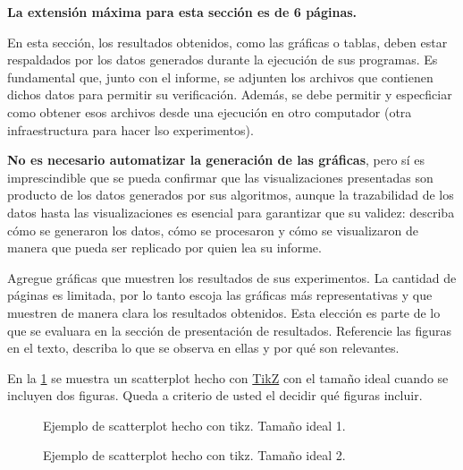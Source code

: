 \begin{mdframed}
    \textbf{La extensión máxima para esta sección es de 6 páginas.}
\end{mdframed}


En esta sección, los resultados obtenidos, como las gráficas o tablas, deben estar respaldados por los datos generados durante la ejecución de sus programas. Es fundamental que, junto con el informe, se adjunten los archivos que contienen dichos datos para permitir su verificación. Además, se debe permitir y especficiar como obtener esos archivos desde una ejecución en otro computador (otra infraestructura para hacer lso experimentos).

\textbf{No es necesario automatizar la generación de las gráficas}, pero sí es imprescindible que se pueda confirmar que las visualizaciones presentadas son producto de los datos generados por sus algoritmos, aunque la trazabilidad de los datos hasta las visualizaciones es esencial para garantizar que su validez: describa cómo se generaron los datos, cómo se procesaron y cómo se visualizaron de manera que pueda ser replicado por quien lea su informe.

Agregue gráficas que muestren los resultados de sus experimentos. La cantidad de páginas es limitada, por lo tanto escoja las gráficas más representativas y que muestren de manera clara los resultados obtenidos. Esta elección es parte de lo que se evaluara en la sección de presentación de resultados. Referencie las figuras en el texto, describa lo que se observa en ellas y por qué son relevantes.

En la \cref{fig:scatterplot_1} se muestra un scatterplot hecho con \href{https://es.overleaf.com/learn/latex/TikZ_package}{TikZ} con el tamaño ideal cuando se incluyen dos figuras. Queda a criterio de usted el decidir qué figuras incluir.

\begin{figure}[H]
    \centering
    
    \caption{Ejemplo de scatterplot hecho con tikz. Tamaño ideal 1.}
    \label{fig:scatterplot_1}
\end{figure}


\begin{figure}[H]
    \centering
    \begin{minipage}[t]{0.5\textwidth}
    
    \end{minipage}%
    \begin{minipage}[t]{0.5\textwidth}
    
    \end{minipage}%
    \caption{Ejemplo de scatterplot hecho con tikz. Tamaño ideal 2.}
    \label{fig:scatterplot_2}
\end{figure}

